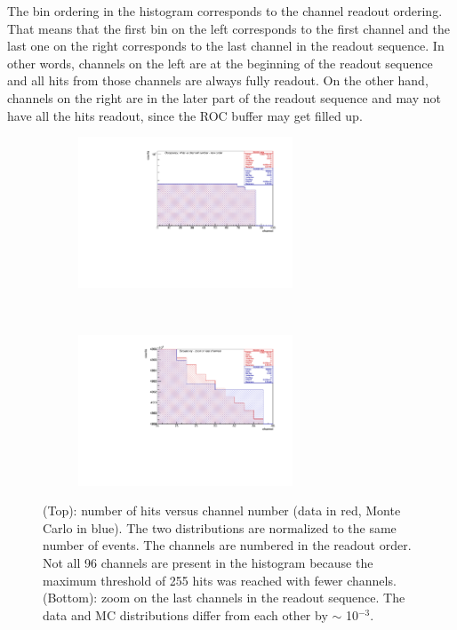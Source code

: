 The bin ordering in the histogram corresponds 
to the channel readout ordering. That means that 
the first bin on the left corresponds to the first 
channel and the last one on the right 
corresponds to the last channel in the readout sequence.
In other words, channels on the left 
are at the beginning of the readout sequence 
and all hits from those channels are always fully readout.
On the other hand, channels on 
the right are in the 
later part of the readout sequence and may 
not have all the hits readout, 
since the ROC buffer may get filled up.
  \begin{figure}[!h]
    \begin{subfigure}[b]{\textwidth}
        \centering
        \includegraphics[width=0.7\textwidth]{figures/pdf/figure_00004_nhitsvschannel_roc_simulation_281.pdf}
        \label{fig:tt1}
    \end{subfigure}
  \\
    \begin{subfigure}[b]{\textwidth}
        \centering
        \includegraphics[width=0.7\textwidth]{figures/pdf/figure_00014_nhitsvschannel_roc_simulation_281.pdf}
        \label{fig:tt2}
    \end{subfigure}
       \caption[The occupancy histogram (RUN281).]{(Top): number of hits versus channel number 
       (data in red, Monte Carlo in blue). The two distributions 
       are normalized to the same number of events.
       The channels are numbered in the readout order. Not all 96 channels 
       are present in the histogram 
       because the maximum threshold of 255 hits was reached with fewer channels.
       (Bottom): zoom on the last channels in the readout sequence. The data 
       and MC distributions differ from each other by $\sim$ 10$^{-3}$.}
       \label{fig:2}
  \end{figure}


